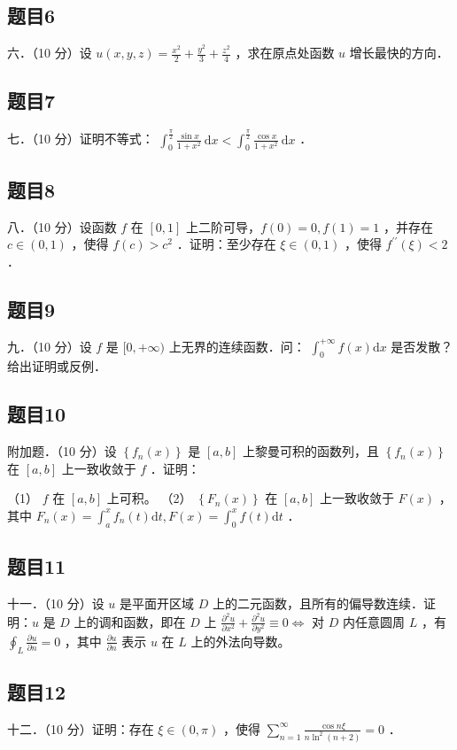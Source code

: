 \documentclass{article}
\begin{document}
\subsection{题目6}
六．（10 分）设 \(u(x, y, z)=\frac{x^{2}}{2}+\frac{y^{2}}{3}+\frac{z^{2}}{4}\) ，求在原点处函数 \(u\) 增长最快的方向．

\subsection{题目7}
七．（10 分）证明不等式： \(\int_{0}^{\frac{\pi}{2}} \frac{\sin x}{1+x^{2}} \mathrm{~d} x<\int_{0}^{\frac{\pi}{2}} \frac{\cos x}{1+x^{2}} \mathrm{~d} x\) ．

\subsection{题目8}
八．（10 分）设函数 \(f\) 在 \([0,1]\) 上二阶可导，\(f(0)=0, f(1)=1\) ，并存在 \(c \in(0,1)\) ，使得 \(f(c)>c^{2}\) ．证明：至少存在 \(\xi \in(0,1)\) ，使得 \(f^{\prime \prime}(\xi)<2\) ．

\subsection{题目9}
九．（10 分）设 \(f\) 是 \([0,+\infty)\) 上无界的连续函数．问： \(\int_{0}^{+\infty} f(x) \mathrm{d} x\) 是否发散？给出证明或反例．

\subsection{题目10}
附加题．（10 分）设 \(\left\{f_{n}(x)\right\}\) 是 \([a, b]\) 上黎曼可积的函数列，且 \(\left\{f_{n}(x)\right\}\) 在 \([a, b]\) 上一致收敛于 \(f\) ．证明：

（1） \(f\) 在 \([a, b]\) 上可积。
（2） \(\left\{F_{n}(x)\right\}\) 在 \([a, b]\) 上一致收敛于 \(F(x)\) ，其中 \(F_{n}(x)=\int_{a}^{x} f_{n}(t) \mathrm{d} t, F(x)=\int_{0}^{x} f(t) \mathrm{d} t\) ．

\subsection{题目11}
十一．（10 分）设 \(u\) 是平面开区域 \(D\) 上的二元函数，且所有的偏导数连续．证明：\(u\) 是 \(D\) 上的调和函数，即在
\(D\) 上 \(\frac{\partial^{2} u}{\partial x^{2}}+\frac{\partial^{2} u}{\partial y^{2}} \equiv 0 \Leftrightarrow\) 对 \(D\) 内任意圆周 \(L\) ，有 \(\oint_{L} \frac{\partial u}{\partial n}=0\) ，其中 \(\frac{\partial u}{\partial n}\) 表示 \(u\) 在 \(L\) 上的外法向导数。

\subsection{题目12}
十二．（10 分）证明：存在 \(\xi \in(0, \pi)\) ，使得 \(\sum_{n=1}^{\infty} \frac{\cos n \xi}{n \ln ^{2}(n+2)}=0\) ．
\end{document}
